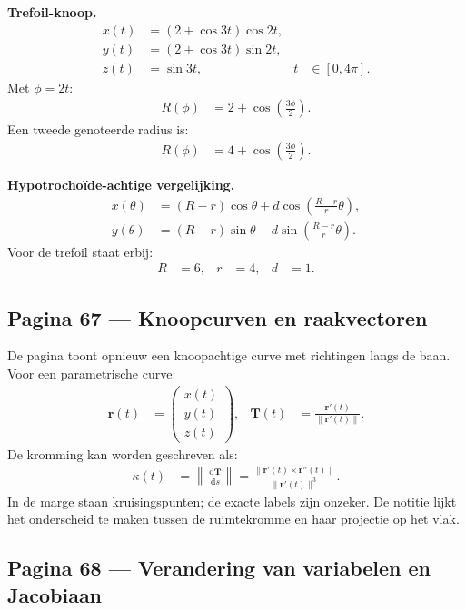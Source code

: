 \documentclass[11pt]{article}
\newcommand{\dd}{\,\mathrm{d}}
\newcommand{\td}[2]{\frac{\dd #1}{\dd #2}}
\newcommand{\vect}[1]{\mathbf{#1}}
\newcommand{\onzeker}[1]{\textcolor{red!70!black}{#1}}
\begin{document}
\textbf{Trefoil-knoop.}
\begin{align*}
x(t)&=\left(2+\cos 3t\right)\cos 2t,\\
y(t)&=\left(2+\cos 3t\right)\sin 2t,\\
z(t)&=\sin 3t,
&
t&\in[0,4\pi].
\end{align*}
Met $\phi=2t$:
\begin{align*}
R(\phi)
&=
2+\cos\left(\frac{3\phi}{2}\right).
\end{align*}
Een tweede genoteerde radius is:
\begin{align*}
R(\phi)
&=
4+\cos\left(\frac{3\phi}{2}\right).
\end{align*}

\textbf{Hypotrochoïde-achtige vergelijking.}
\begin{align*}
x(\theta)
&=
(R-r)\cos\theta
+
d\cos\left(\frac{R-r}{r}\theta\right),\\
y(\theta)
&=
(R-r)\sin\theta
-
d\sin\left(\frac{R-r}{r}\theta\right).
\end{align*}
Voor de trefoil staat erbij:
\begin{align*}
R&=6,
&
r&=4,
&
d&=1.
\end{align*}

\subsection*{Pagina 67 --- Knoopcurven en raakvectoren}

De pagina toont opnieuw een knoopachtige curve met richtingen langs de baan. Voor een parametrische curve:
\begin{align*}
\vect{r}(t)
&=
\begin{pmatrix}
x(t)\\y(t)\\z(t)
\end{pmatrix},
&
\vect{T}(t)
&=
\frac{\vect{r}'(t)}{\|\vect{r}'(t)\|}.
\end{align*}
De kromming kan worden geschreven als:
\begin{align*}
\kappa(t)
&=
\left\|\td{\vect{T}}{s}\right\|
=
\frac{\|\vect{r}'(t)\times\vect{r}''(t)\|}
{\|\vect{r}'(t)\|^3}.
\end{align*}
In de marge staan kruisingspunten; de exacte labels zijn \onzeker{onzeker}. De notitie lijkt het onderscheid te maken tussen de ruimtekromme en haar projectie op het vlak.

\subsection*{Pagina 68 --- Verandering van variabelen en Jacobiaan}
\end{document}
